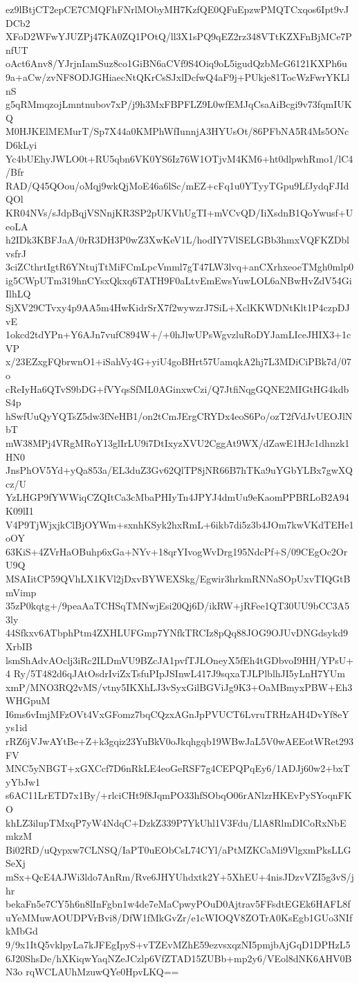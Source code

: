 ez9lBtjCT2epCE7CMQFhFNrlMObyMH7KzfQE0QFuEpzwPMQTCxqos6Ipt9vJDCb2
XFoD2WFwYJUZPj47KA0ZQ1POtQ/ll3X1sPQ9qEZ2rz348VTtKZXFnBjMCe7PnfUT
oAct6Anv8/YJrjnIamSuz8co1GiBN6aCVf9S4Oiq9oL5igudQzbMcG6121KXPh6u
9a+aCw/zvNF8ODJGHiaecNtQKrCsSJxlDcfwQ4aF9j+PUkje81TocWzFwrYKLlnS
g5qRMmqzojLmntnubov7xP/j9h3MxFBPFLZ9L0wfEMJqCsaAiBcgi9v73fqmIUKQ
M0HJKElMEMurT/Sp7X44a0KMPhWfIunnjA3HYUsOt/86PFbNA5R4Ms5ONcD6kLyi
Yc4bUEhyJWLO0t+RU5qbn6VK0YS6Iz76W1OTjvM4KM6+ht0dlpwhRmo1/lC4/Bfr
RAD/Q45QOou/oMqj9wkQjMoE46a6lSc/mEZ+cFq1u0YTyyTGpu9LfJydqFJIdQOl
KR04NVs/sJdpBqjVSNnjKR3SP2pUKVhUgTI+mVCvQD/IiXsdnB1QoYwusf+UeoLA
h2IDk3KBFJaA/0rR3DH3P0wZ3XwKeV1L/hodIY7VlSELGBb3hmxVQFKZDblvsfrJ
3ciZCthrtIgtR6YNtujTtMiFCmLpcVmml7gT47LW3lvq+anCXrhxeoeTMgh0mlp0
ig5CWpUTm319hnCYsxQkxq6TATH9F0aLtvEmEwsYuwLOL6aNBwHvZdV54GiIlhLQ
SjXV29CTvxy4p9AA5m4HwKidrSrX7f2wywzrJ7SiL+XclKKWDNtKlt1P4czpDJvE
1okcd2tdYPn+Y6AJn7vufC894W+/+0hJlwUPsWgvzluRoDYJamLIceJHIX3+1cVP
x/23EZxgFQbrwnO1+iSahVy4G+yiU4goBHrt57UamqkA2hj7L3MDiCiPBk7d/07o
cReIyHa6QTvS9bDG+fVYqsSfML0AGinxwCzi/Q7JtfiNqgGQNE2MIGtHG4kdbS4p
hSwfUuQyYQTsZ5dw3fNeHB1/on2tCmJErgCRYDx4eoS6Po/ozT2fVdJvUEOJlNbT
mW38MPj4VRgMRoY13glIrLU9i7DtIxyzXVU2CggAt9WX/dZawE1HJc1dhnzk1HN0
JnsPhOV5Yd+yQa853a/EL3duZ3Gv62QlTP8jNR66B7hTKa9uYGbYLBx7gwXQcz/U
YzLHGP9fYWWiqCZQItCa3cMbaPHIyTn4JPYJ4dmUu9eKaomPPBRLoB2A94K09lI1
V4P9TjWjxjkClBjOYWm+sxnhKSyk2hxRmL+6ikb7di5z3b4JOm7kwVKdTEHe1oOY
63KiS+4ZVrHaOBuhp6xGa+NYv+18qrYIvogWvDrg195NdcPf+S/09CEgOc2OrU9Q
MSAIitCP59QVhLX1KVl2jDxvBYWEXSkg/Egwir3hrkmRNNaSOpUxvTIQGtBmVimp
35zP0kqtg+/9peaAaTCHSqTMNwjEsi20Qj6D/ikRW+jRFee1QT30UU9bCC3A53ly
44Sfkxv6ATbphPtm4ZXHLUFGmp7YNfkTRCIz8pQq88JOG9OJUvDNGdsykd9XrbIB
lsmShAdvAOclj3iRc2ILDmVU9BZcJA1pvfTJLOneyX5fEh4tGDbvoI9HH/YPsU+4
Ry/5T482d6qJAtOsdrIviZxTsfuPIpJSInwL417J9sqxaTJLPlblhJI5yLnH7YUm
xmP/MNO3RQ2vMS/vtny5IKXhLJ3vSyxGilBGViJg9K3+OaMBmyxPBW+Eh3WHGpuM
I6ms6vImjMFzOVt4VxGFomz7bqCQzxAGnJpPVUCT6LvruTRHzAH4DvYf8eYys1id
rRZ6jVJwAYtBe+Z+k3gqiz23YuBkV0oJkqhgqb19WBwJaL5V0wAEEotWRet293FV
MNC5yNBGT+xGXCcf7D6nRkLE4eoGeRSF7g4CEPQPqEy6/1ADJj60w2+bxTyYbJw1
s6AC11LrETD7x1By/+rlciCHt9f8JqmPO33hfSObqO06rANlzrHKEvPySYoqnFKO
khLZ3ilupTMxqP7yW4NdqC+DzkZ339P7YkUhl1V3Fdu/LlA8RlmDICoRxNbEmkzM
Bi02RD/uQypxw7CLNSQ/IaPT0uEObCsL74CYl/aPtMZKCaMi9VlgxmPksLLGSeXj
mSx+QcE4AJWi3ldo7AnRm/Rve6JHYUhdxtk2Y+5XhEU+4nisJDzvVZI5g3vS/jhr
bekaFn5e7CY5h6n8lInFgbn1w4de7eMaCpwyPOuD0Ajtrav5FFsdtEGEk6HAFL8f
uYeMMuwAOUDPVrBvi8/DfW1fMkGvZr/e1cWIOQV8ZOTrA0KsEgb1GUo3NIfkMbGd
9/9x1ItQ5vklpyLa7kJFEgIpyS+vTZEvMZhE59ezvsxqzNI5pmjbAjGqD1DPHzL5
6J20ShsDe/hXKiqwYaqNZeJCzlp6VfZTAD15ZUBb+mp2y6/VEol8dNK6AHV0BN3o
rqWCLAUhMzuwQYe0HpvLKQ==
